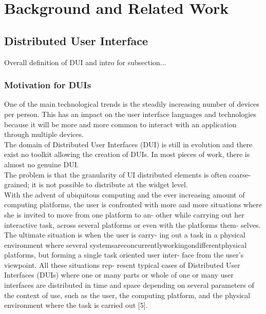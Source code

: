 \chapter{Background and Related Work}\label{chapter:litreview}
\section{Distributed User Interface}
Overall definition of DUI and intro for subsection...
\subsection{Motivation for DUIs}

\cite{manca2011distributing} One of the main technological trends is the
steadily increasing number of devices per person. This has an impact on the user
interface languages and technologies because it will be more and more common to
interact with an application through multiple devices.\\

\cite{melchior2011distribution}The domain of Distributed User Interfaces (DUI) is still in evolution and there exist no toolkit allowing the creation of DUIs.
In most pieces of work, there is almost no genuine DUI. \\

\cite{melchior2011distribution}The problem is that the granularity of UI
distributed elements is often coarse-grained; it is not possible to distribute
at the widget level.\\

\cite{demeure20084c}
With the advent of ubiquitous computing and the ever increasing amount of computing platforms, the user is confronted with more and more situations where she is invited to move from one platform to an- other
while carrying out her interactive task, across several platforms or even with
the platforms them- selves. The ultimate situation is when the user is carry-
ing out a task in a physical environment where several systemsareconcurrentlyworkingondifferentphysical platforms, but forming a single task oriented user inter- face from the user’s viewpoint. All these situations rep- resent typical cases of Distributed User Interfaces (DUIs) where one or many parts or whole of one or many user interfaces are distributed in time and space depending on several parameters of the context of use, such as the user, the computing platform, and the physical environment where the task is carried out [5].\\


